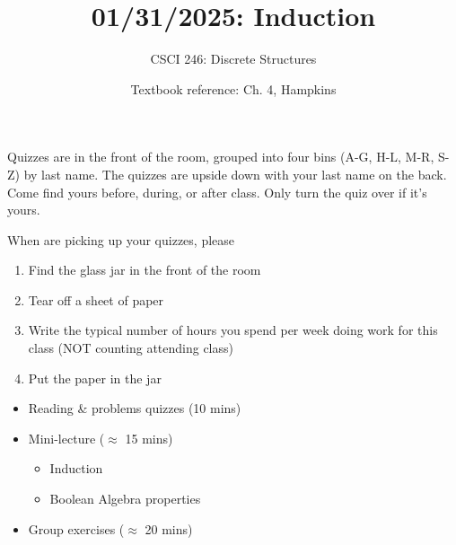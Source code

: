\documentclass[10pt]{beamer}
\begin{document}






\title{01/31/2025: Induction}
\author{CSCI 246: Discrete Structures}
\date{Textbook reference: Ch. 4, Hampkins}

\begin{frame}
    \titlepage 
\end{frame}


\begin{frame}
\footnotesize 

\begin{mygreenbox}[title=Graded Quiz Pickup]
Quizzes are in the front of the room, grouped into four bins (A-G, H-L, M-R, S-Z) by last name. The quizzes are upside down with your last name on the back. Come find yours before, during, or after class.  Only turn the quiz over if it's yours.
\end{mygreenbox} 
\vfill 

\begin{myredbox}[title=Anonymous (Old School) Poll]
When are picking up your quizzes, please 
\begin{enumerate}
\item Find the glass jar in the front of the room
\item Tear off a sheet of paper 	
\item Write the typical number of hours you spend per week doing work for this class (NOT counting attending class) 
\item Put the paper in the jar
\end{enumerate}
\end{myredbox}

\vfill 


\begin{myyellowbox}[title=Today's Agenda]
\begin{itemize}
	\item Reading \& problems quizzes  (10 mins)
	\item Mini-lecture ($\approx$ 15 mins)
	\begin{itemize}
	\footnotesize 
	\item Induction 
	\item Boolean Algebra properties
	\end{itemize}
	\item Group exercises ($\approx$ 20 mins)
\end{itemize}

\end{myyellowbox}
\vfill 

\end{frame}
\end{document}
